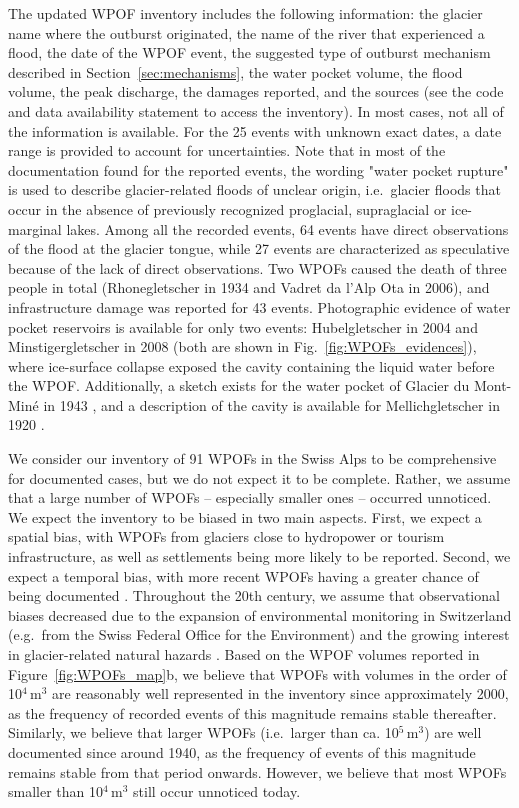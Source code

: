 The updated WPOF inventory includes the following information: the glacier name where the outburst originated, the name of the river that experienced a flood, the date of the WPOF event, the suggested type of outburst mechanism described in Section~\ref{sec:mechanisms}, the water pocket volume, the flood volume, the peak discharge, the damages reported, and the sources (see the code and data availability statement to access the inventory). In most cases, not all of the information is available. For the 25 events with unknown exact dates, a date range is provided to account for uncertainties. Note that in most of the documentation found for the reported events, the wording "water pocket rupture" is used to describe glacier-related floods of unclear origin, i.e.\ glacier floods that occur in the absence of previously recognized proglacial, supraglacial or ice-marginal lakes. Among all the recorded events, 64 events have direct observations of the flood at the glacier tongue, while 27 events are characterized as speculative because of the lack of direct observations. Two WPOFs caused the death of three people in total (Rhonegletscher in 1934 and Vadret da l'Alp Ota in 2006), and infrastructure damage was reported for 43 events. Photographic evidence of water pocket reservoirs is available for only two events: Hubelgletscher in 2004 and Minstigergletscher in 2008 (both are shown in Fig.~\ref{fig:WPOFs_evidences}), where ice-surface collapse exposed the cavity containing the liquid water before the WPOF. Additionally, a sketch exists for the water pocket of Glacier du Mont-Miné in 1943 \citep{Hagen1944}, and a description of the cavity is available for Mellichgletscher in 1920 \citep{Mercanton1921}.


We consider our inventory of 91 WPOFs in the Swiss Alps to be comprehensive for documented cases, but we do not expect it to be complete. Rather, we assume that a large number of WPOFs -- especially smaller ones -- occurred unnoticed. We expect the inventory to be biased in two main aspects. First, we expect a spatial bias, with WPOFs from glaciers close to hydropower or tourism infrastructure, as well as settlements being more likely to be reported. Second, we expect a temporal bias, with more recent WPOFs having a greater chance of being documented \citep[see also][for biases in reporting GLOFs worldwide]{Veh&al2022}. Throughout the 20th century, we assume that observational biases decreased due to the expansion of environmental monitoring in Switzerland (e.g.\ from the Swiss Federal Office for the Environment) and the growing interest in glacier-related natural hazards \citep[e.g.][]{Haeberli1983,Raymond&al2003}. Based on the WPOF volumes reported in Figure~\ref{fig:WPOFs_map}b, we believe that WPOFs with volumes in the order of 10$^4$\,m$^3$ are reasonably well represented in the inventory since approximately 2000, as the frequency of recorded events of this magnitude remains stable thereafter. Similarly, we believe that larger WPOFs (i.e.\ larger than ca. 10$^5$\,m$^3$) are well documented since around 1940, as the frequency of events of this magnitude remains stable from that period onwards. However, we believe that most WPOFs smaller than 10$^4$\,m$^3$ still occur unnoticed today. 

